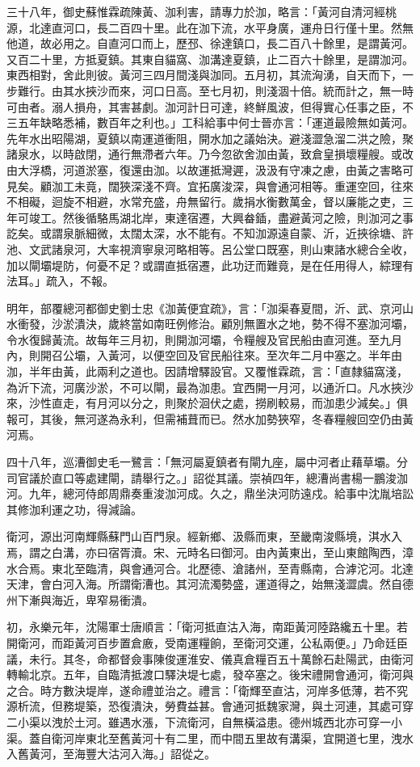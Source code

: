 三十八年，御史蘇惟霖疏陳黃、泇利害，請專力於泇，略言：「黃河自清河經桃源，北達直河口，長二百四十里。此在泇下流，水平身廣，運舟日行僅十里。然無他道，故必用之。自直河口而上，歷邳、徐達鎮口，長二百八十餘里，是謂黃河。又百二十里，方抵夏鎮。其東自貓窩、泇溝達夏鎮，止二百六十餘里，是謂泇河。東西相對，舍此則彼。黃河三四月間淺與泇同。五月初，其流洶湧，自天而下，一步難行。由其水挾沙而來，河口日高。至七月初，則淺涸十倍。統而計之，無一時可由者。溺人損舟，其害甚劇。泇河計日可達，終鮮風波，但得實心任事之臣，不三五年缺略悉補，數百年之利也。」工科給事中何士晉亦言：「運道最險無如黃河。先年水出昭陽湖，夏鎮以南運道衝阻，開水加之議始決。避淺澀急溜二洪之險，聚諸泉水，以時啟閉，通行無滯者六年。乃今忽欲舍泇由黃，致倉皇損壞糧艘。或改由大浮橋，河道淤塞，復還由泇。以故運抵灣遲，汲汲有守凍之慮，由黃之害略可見矣。顧泇工未竟，闊狹深淺不齊。宜拓廣浚深，與會通河相等。重運空回，往來不相礙，迴旋不相避，水常充盛，舟無留行。歲捐水衡數萬金，督以廉能之吏，三年可竣工。然後循駱馬湖北岸，東達宿遷，大興畚鍤，盡避黃河之險，則泇河之事訖矣。或謂泉脈細微，太闊太深，水不能有。不知泇源遠自蒙、沂，近挾徐塘、許池、文武諸泉河，大率視濟寧泉河略相等。呂公堂口既塞，則山東諸水總合全收，加以閘壩堤防，何憂不足？或謂直抵宿遷，此功迂而難竟，是在任用得人，綜理有法耳。」疏入，不報。

明年，部覆總河都御史劉士忠《泇黃便宜疏》，言：「泇渠春夏間，沂、武、京河山水衝發，沙淤潰決，歲終當如南旺例修治。顧別無置水之地，勢不得不塞泇河壩，令水復歸黃流。故每年三月初，則開泇河壩，令糧艘及官民船由直河進。至九月內，則開召公壩，入黃河，以便空回及官民船往來。至次年二月中塞之。半年由泇，半年由黃，此兩利之道也。因請增驛設官。又覆惟霖疏，言：「直隸貓窩淺，為沂下流，河廣沙淤，不可以閘，最為泇患。宜西開一月河，以通沂口。凡水挾沙來，沙性直走，有月河以分之，則聚於洄伏之處，撈刷較易，而泇患少減矣。」俱報可，其後，無河遂為永利，但需補葺而已。然水加勢狹窄，冬春糧艘回空仍由黃河焉。

四十八年，巡漕御史毛一鷺言：「無河屬夏鎮者有閘九座，屬中河者止藉草壩。分司官議於直口等處建閘，請舉行之。」詔從其議。崇禎四年，總漕尚書楊一鵬浚泇河。九年，總河侍郎周鼎奏重浚泇河成。久之，鼎坐決河防遠戍。給事中沈胤培訟其修泇利運之功，得減論。

衛河，源出河南輝縣蘇門山百門泉。經新鄉、汲縣而東，至畿南浚縣境，淇水入焉，謂之白溝，亦曰宿胥瀆。宋、元時名曰御河。由內黃東出，至山東館陶西，漳水合焉。東北至臨清，與會通河合。北歷德、滄諸州，至青縣南，合滹沱河。北達天津，會白河入海。所謂衛漕也。其河流濁勢盛，運道得之，始無淺澀虞。然自德州下漸與海近，卑窄易衝潰。

初，永樂元年，沈陽軍士唐順言：「衛河抵直沽入海，南距黃河陸路纔五十里。若開衛河，而距黃河百步置倉廒，受南運糧餉，至衛河交運，公私兩便。」乃命廷臣議，未行。其冬，命都督僉事陳俊運淮安、儀真倉糧百五十萬餘石赴陽武，由衛河轉輸北京。五年，自臨清抵渡口驛決堤七處，發卒塞之。後宋禮開會通河，衛河與之合。時方數決堤岸，遂命禮並治之。禮言：「衛輝至直沽，河岸多低薄，若不究源析流，但務堤築，恐復潰決，勞費益甚。會通河抵魏家灣，與土河連，其處可穿二小渠以洩於土河。雖遇水漲，下流衛河，自無橫溢患。德州城西北亦可穿一小渠。蓋自衛河岸東北至舊黃河十有二里，而中間五里故有溝渠，宜開道七里，洩水入舊黃河，至海豐大沽河入海。」詔從之。


